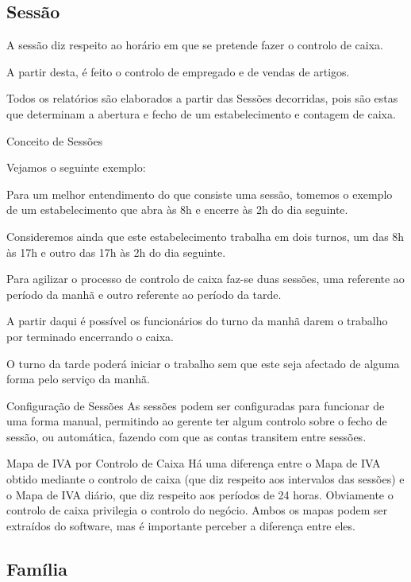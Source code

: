 \documentclass[a4paper,11pt,openany]{memoir}
\newcommand\dica{\texttt{[image: ../small-n-flat-master/png/96/light-bulb.png]}}
\newcommand\exemplo{\texttt{[image: ../small-n-flat-master/png/96/notepad.png]}}
\newcommand\atencao{\texttt{[image: ../small-n-flat-master/png/96/post-it.png]}}
\newcommand{\bcdica}[2]{\vspace{5mm}\begin{bclogo}[couleur=blue!30,logo=\dica]{\hspace{0.7cm}#1}{#2}\end{bclogo}}
\newcommand{\bcexemplo}[2]{\vspace{5mm}\begin{bclogo}[couleur=green!30,logo=\exemplo]{\hspace{0.7cm}#1}{#2}\end{bclogo}}
\newcommand{\bcatencao}[2]{\vspace{5mm}\begin{bclogo}[couleur=yellow!30,logo=\atencao]{\hspace{0.7cm}#1}{#2}\end{bclogo}}
\begin{document}
\subsection{Sessão}

A sessão diz respeito ao horário em que se pretende fazer o controlo de caixa.

A partir desta, é feito o controlo de empregado e de vendas de artigos. 

Todos os relatórios são elaborados a partir das Sessões decorridas, pois são estas 
que determinam a abertura e fecho de um estabelecimento e contagem de caixa.



\bcexemplo{Conceito de Sessões}{
Vejamos o seguinte exemplo:

Para um melhor entendimento do que consiste uma sessão, tomemos o exemplo de um estabelecimento 
que abra às 8h e encerre às 2h do dia seguinte.

Consideremos ainda que este estabelecimento 
trabalha em dois turnos, um das 8h às 17h e outro das 17h às 2h do dia seguinte.

Para agilizar o processo de controlo de caixa faz-se duas sessões, uma referente ao período da manhã e outro 
referente ao período da tarde. 

A partir daqui é possível os funcionários do turno da manhã darem o trabalho por terminado encerrando o caixa. 

O turno da tarde poderá iniciar o trabalho sem que este seja afectado de alguma forma pelo serviço da manhã.
}


\bcdica{Configuração de Sessões}{
As sessões podem ser configuradas para funcionar de uma forma manual, permitindo ao gerente ter algum controlo
sobre o fecho de sessão, ou automática, fazendo com que as contas transitem entre sessões. 
}


\bcatencao{Mapa de IVA por Controlo de Caixa}{
Há uma diferença entre o Mapa de IVA obtido mediante o controlo de caixa (que diz respeito aos intervalos das
sessões) e o Mapa de IVA diário, que diz respeito aos períodos de 24 horas. Obviamente o controlo de caixa privilegia
o controlo do negócio. Ambos os mapas podem ser extraídos do software, mas é importante perceber a diferença entre eles.
}


\subsection{Família}
\end{document}
